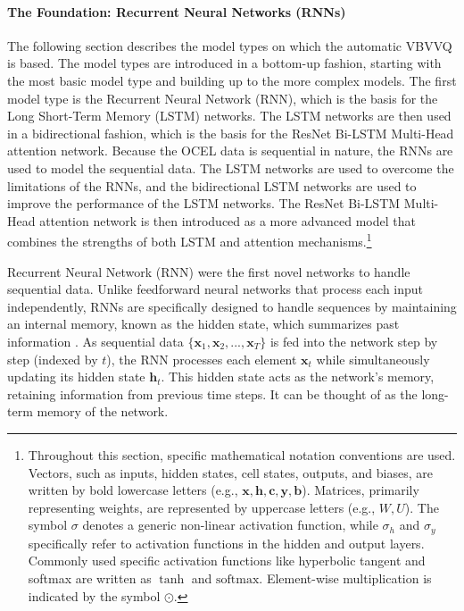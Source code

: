 \paragraph{\textbf{The Foundation: Recurrent Neural Networks (RNNs)}}
\label{sec:rnn}
The following section describes the model types on which the automatic VBVVQ is based. The model types are introduced in a bottom-up fashion, starting with the most basic model type and building up to the more complex models. The first model type is the Recurrent Neural Network (RNN), which is the basis for the Long Short-Term Memory (LSTM) networks. The LSTM networks are then used in a bidirectional fashion, which is the basis for the ResNet Bi-LSTM Multi-Head attention network. Because the OCEL data is sequential in nature, the RNNs are used to model the sequential data. The LSTM networks are used to overcome the limitations of the RNNs, and the bidirectional LSTM networks are used to improve the performance of the LSTM networks. The ResNet Bi-LSTM Multi-Head attention network is then introduced as a more advanced model that combines the strengths of both LSTM and attention mechanisms.\footnote{Throughout this section, specific mathematical notation conventions are used. Vectors, such as inputs, hidden states, cell states, outputs, and biases, are written by bold lowercase letters (e.g., \( \bm{x}, \bm{h}, \bm{c}, \bm{y}, \bm{b} \)). Matrices, primarily representing weights, are represented by uppercase letters (e.g., \( W, U \)). The symbol \( \sigma \) denotes a generic non-linear activation function, while \( \sigma_h \) and \( \sigma_y \) specifically refer to activation functions in the hidden and output layers. Commonly used specific activation functions like hyperbolic tangent and softmax are written as \( \tanh \) and \( \text{softmax} \). Element-wise multiplication is indicated by the symbol \( \odot \).}

Recurrent Neural Network (RNN) were the first novel networks to handle sequential data. Unlike feedforward neural networks that process each input independently, RNNs are specifically designed to handle sequences by maintaining an internal memory, known as the hidden state, which summarizes past information \autocite{geron2022hands}. As sequential data \( \{ \bm{x}_1, \bm{x}_2, ..., \bm{x}_T \} \) is fed into the network step by step (indexed by \( t \)), the RNN processes each element \( \bm{x}_t \) while simultaneously updating its hidden state \( \bm{h}_t \). This hidden state acts as the network's memory, retaining information from previous time steps. It can be thought of as the long-term memory of the network.

